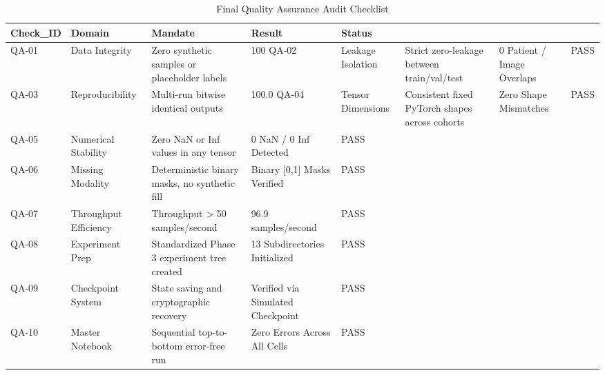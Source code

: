 \begin{table}
\caption{Final Quality Assurance Audit Checklist}
\begin{tabular}{lllll}
\toprule
Check_ID & Domain & Mandate & Result & Status \\
\midrule
QA-01 & Data Integrity & Zero synthetic samples or placeholder labels & 100%
QA-02 & Leakage Isolation & Strict zero-leakage between train/val/test & 0 Patient / Image Overlaps & PASS \\
QA-03 & Reproducibility & Multi-run bitwise identical outputs & 100.0%
QA-04 & Tensor Dimensions & Consistent fixed PyTorch shapes across cohorts & Zero Shape Mismatches & PASS \\
QA-05 & Numerical Stability & Zero NaN or Inf values in any tensor & 0 NaN / 0 Inf Detected & PASS \\
QA-06 & Missing Modality & Deterministic binary masks, no synthetic fill & Binary [0,1] Masks Verified & PASS \\
QA-07 & Throughput Efficiency & Throughput > 50 samples/second & 96.9 samples/second & PASS \\
QA-08 & Experiment Prep & Standardized Phase 3 experiment tree created & 13 Subdirectories Initialized & PASS \\
QA-09 & Checkpoint System & State saving and cryptographic recovery & Verified via Simulated Checkpoint & PASS \\
QA-10 & Master Notebook & Sequential top-to-bottom error-free run & Zero Errors Across All Cells & PASS \\
\bottomrule
\end{tabular}
\end{table}
